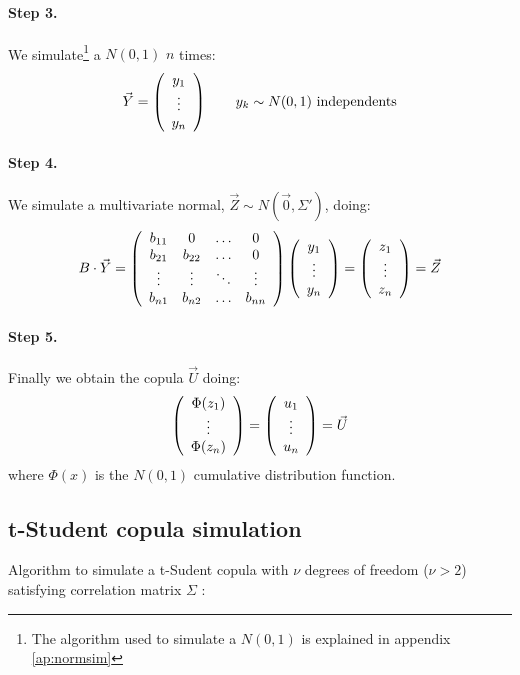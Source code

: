 \documentclass[a4paper,12pt,final]{article}
\begin{document}
\paragraph{Step 3.} We simulate\footnote{The algorithm used to simulate a $N(0,1)$
is explained in appendix \ref{ap:normsim}} a $N(0,1)$ $n$ times:
\begin{displaymath}
\vec{Y} =
\left(
\begin{array}{c}
y_1 \cr
\vdots \cr
y_n
\end{array}
\right) 
\qquad y_k \sim N(0,1) \textrm{ independents}
\end{displaymath}

\paragraph{Step 4.} We simulate a multivariate normal, $\vec{Z} \sim N(\vec{0}, \Sigma')$, 
doing:
\begin{displaymath}
B \cdot \vec{Y} 
=
\left(
\begin{array}{cccc}
b_{11}   & 0        & \ldots & 0       \cr
b_{21}   & b_{22}   & \ldots & 0       \cr
\vdots  & \vdots  & \ddots & \vdots \cr
b_{n1}   & b_{n2}   & \ldots & b_{nn}
\end{array}
\right)
\left(
\begin{array}{c}
y_1 \cr
\vdots \cr
y_n
\end{array}
\right) 
=
\left(
\begin{array}{c}
z_1 \cr
\vdots \cr
z_n
\end{array}
\right) 
= 
\vec{Z}
\end{displaymath}

\paragraph{Step 5.} Finally we obtain the copula $\vec{U}$ doing:
\begin{displaymath}
\left(
\begin{array}{c}
\Phi(z_1) \cr
\vdots \cr
\Phi(z_n)
\end{array}
\right) 
=
\left(
\begin{array}{c}
u_1 \cr
\vdots \cr
u_n
\end{array}
\right) 
=
\vec{U} 
\end{displaymath}
where $\Phi(x)$ is the $N(0,1)$ cumulative distribution function.

\subsection{t-Student copula simulation}
\label{ap:tstudentcopu}
Algorithm to simulate a t-Sudent copula with $\nu$ degrees of freedom ($\nu > 2$) 
satisfying correlation matrix $\Sigma$ \cite{copu:pricing}:
\end{document}
